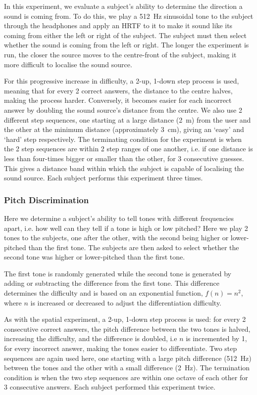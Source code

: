 \documentclass[format=sigconf, review=true, screen=true, anonymous=true]{acmart}
\begin{document}
In this experiment, we evaluate a subject's ability to determine the direction a sound is coming from. To do this, we play a \SI{512}{\hertz} sinusoidal tone to the subject through the headphones and apply an HRTF to it to make it sound like its coming from either the left or right of the subject. The subject must then select whether the sound is coming from the left or right. The longer the experiment is run, the closer the source moves to the centre-front of the subject, making it more difficult to localise the sound source. 

For this progressive increase in difficulty, a 2-up, 1-down step process is used, meaning that for every 2 correct answers, the distance to the centre halves, making the process harder. Conversely, it becomes easier for each incorrect answer by doubling the sound source's distance from the centre. We also use 2 different step sequences, one starting at a large distance (\SI{2}{\m}) from the user and the other at the minimum distance (approximately \SI{3}{\cm}), giving an `easy' and `hard' step respectively. The terminating condition for the experiment is when the 2 step sequences are within 2 step ranges of one another, i.e. if one distance is less than four-times bigger or smaller than the other, for 3 consecutive guesses. This gives a distance band within which the subject is capable of localising the sound source. Each subject performs this experiment three times. 

\subsubsection{Pitch Discrimination}

Here we determine a subject's ability to tell tones with different frequencies apart, i.e. how well can they tell if a tone is high or low pitched? Here we play 2 tones to the subjects, one after the other, with the second being higher or lower-pitched than the first tone. The subjects are then asked to select whether the second tone was higher or lower-pitched than the first tone.

The first tone is randomly generated while the second tone is generated by adding or subtracting the difference from the first tone. This difference determines the difficulty and is based on an exponential function, $f(n) = n^2$, where $n$ is increased or decreased to adjust the differentiation difficulty. 

As with the spatial experiment, a 2-up, 1-down step process is used: for every 2 consecutive correct answers, the pitch difference between the two tones is halved, increasing the difficulty, and the difference is doubled, i.e $n$ is incremented by 1, for every incorrect answer, making the tones easier to differentiate. Two step sequences are again used here, one starting with a large pitch difference (\SI{512}{\hertz}) between the tones and the other with a small difference (\SI{2}{\hertz}). The termination condition is when the two step sequences are within one octave of each other for 3 consecutive answers. Each subject performed this experiment twice. 
\end{document}
